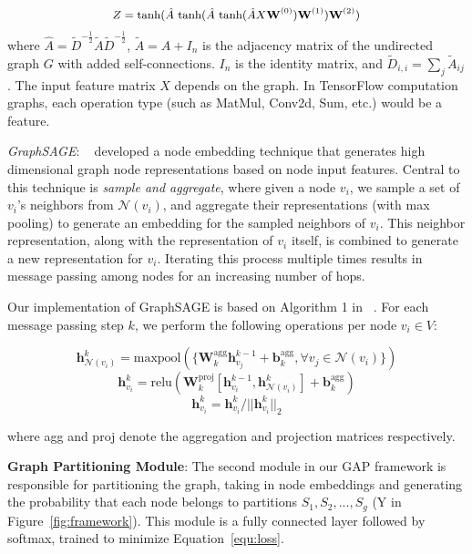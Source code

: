 \documentclass[10pt,twocolumn]{article}
\begin{document}
\begin{equation*}
\label{equ:gcn}
\small
\begin{aligned}
Z = \text{tanh}(\hat{A} \text{~tanh}(\hat{A} \text{~tanh}(\hat{A}X\mathbf{W}^{(0)}) \mathbf{W}^{(1)} )  \mathbf{W}^{(2)} )
\end{aligned}
\end{equation*}
where $\hat{A} = \tilde{D}^{-\frac{1}{2}} \tilde{A} \tilde{D}^{-\frac{1}{2}}$, $\tilde{A} = A + I_{n}$ is the adjacency matrix of the undirected graph $G$ with added self-connections. $I_{n}$ is the identity matrix, and $\tilde{D}_{i,i} = \sum_j \tilde{A}_{ij}$. The input feature matrix $X$ depends on the graph. In TensorFlow computation graphs, each operation type (such as MatMul, Conv2d, Sum, etc.) would be a feature.

\noindent\emph{GraphSAGE}:
~\cite{HamiltonYL17} developed a node embedding technique that generates high dimensional graph node representations based on node input features. Central to this technique is \emph{sample and aggregate}, where given a node $v_i$, we sample a set of $v_i$'s neighbors from $\mathcal{N}(v_i)$, and aggregate their representations (with max pooling) to generate an embedding for the sampled neighbors of $v_i$. This neighbor representation, along with the representation of $v_i$ itself, is combined to generate a new representation for $v_i$. Iterating this process multiple times results in message passing among nodes for an increasing number of hops. 

Our implementation of GraphSAGE is based on Algorithm 1 in ~\cite{HamiltonYL17}. For each message passing step $k$, we perform the following operations per node $v_i \in V$:

$$\mathbf{h}^k_{\mathcal{N}(v_i)} = \text{maxpool}(\{\mathbf{W}^{\text{agg}}_k\mathbf{h}_{v_j}^{k - 1} + \mathbf{b}^{\text{agg}}_k , \forall v_j \in \mathcal{N}(v_i)\})$$
$$\mathbf{h}_{v_i}^k = \text{relu}(\mathbf{W}_k^{\text{proj}}[\mathbf{h}_{v_i}^{k - 1}, \mathbf{h}_{\mathcal{N}(v_i)}^k] + \mathbf{b}^{\text{agg}}_k)$$
$$\mathbf{h}^k_{v_i} = \mathbf{h}^k_{v_i} / ||\mathbf{h}^k_{v_i}||_2$$

where agg and proj denote the aggregation and projection matrices respectively.

\noindent\textbf{Graph Partitioning Module}:
The second module in our GAP framework is responsible for partitioning the graph, taking in node embeddings and generating the probability that each node belongs to partitions $S_1, S_2, ..., S_g$ (Y in Figure~\ref{fig:framework}). This module is a fully connected layer followed by softmax, trained to minimize Equation~\ref{equ:loss}. 
\end{document}
